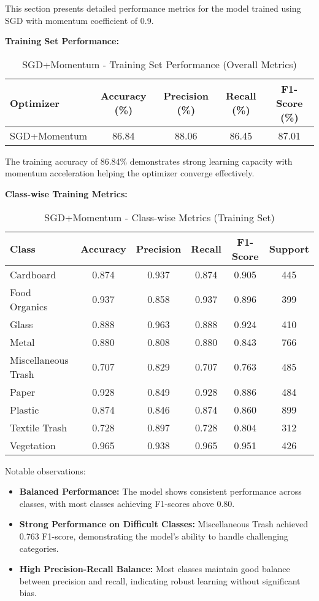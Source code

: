 \documentclass[12pt,a4paper]{article}
\begin{document}
This section presents detailed performance metrics for the model trained using SGD with momentum coefficient of 0.9.

\textbf{Training Set Performance:}

\begin{table}[H]
\centering
\caption{SGD+Momentum - Training Set Performance (Overall Metrics)}
\begin{tabular}{lcccc}
\toprule
\textbf{Optimizer} & \textbf{Accuracy (\%)} & \textbf{Precision (\%)} & \textbf{Recall (\%)} & \textbf{F1-Score (\%)} \\
\midrule
SGD+Momentum & 86.84 & 88.06 & 86.45 & 87.01 \\
\bottomrule
\end{tabular}
\end{table}

The training accuracy of 86.84\% demonstrates strong learning capacity with momentum acceleration helping the optimizer converge effectively.

\textbf{Class-wise Training Metrics:}

\begin{table}[H]
\centering
\caption{SGD+Momentum - Class-wise Metrics (Training Set)}
\begin{tabular}{lccccc}
\toprule
\textbf{Class} & \textbf{Accuracy} & \textbf{Precision} & \textbf{Recall} & \textbf{F1-Score} & \textbf{Support} \\
\midrule
Cardboard & 0.874 & 0.937 & 0.874 & 0.905 & 445 \\
Food Organics & 0.937 & 0.858 & 0.937 & 0.896 & 399 \\
Glass & 0.888 & 0.963 & 0.888 & 0.924 & 410 \\
Metal & 0.880 & 0.808 & 0.880 & 0.843 & 766 \\
Miscellaneous Trash & 0.707 & 0.829 & 0.707 & 0.763 & 485 \\
Paper & 0.928 & 0.849 & 0.928 & 0.886 & 484 \\
Plastic & 0.874 & 0.846 & 0.874 & 0.860 & 899 \\
Textile Trash & 0.728 & 0.897 & 0.728 & 0.804 & 312 \\
Vegetation & 0.965 & 0.938 & 0.965 & 0.951 & 426 \\
\bottomrule
\end{tabular}
\end{table}

Notable observations:
\begin{itemize}
    \item \textbf{Balanced Performance:} The model shows consistent performance across classes, with most classes achieving F1-scores above 0.80.
    \item \textbf{Strong Performance on Difficult Classes:} Miscellaneous Trash achieved 0.763 F1-score, demonstrating the model's ability to handle challenging categories.
    \item \textbf{High Precision-Recall Balance:} Most classes maintain good balance between precision and recall, indicating robust learning without significant bias.
\end{itemize}
\end{document}
